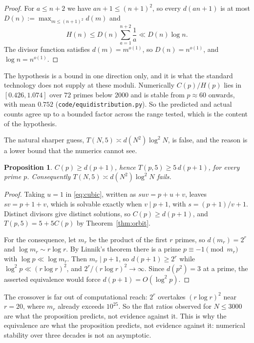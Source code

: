 \documentclass[11pt]{article}
\theoremstyle{plain}
\newtheorem{proposition}[theorem]{Proposition}
\theoremstyle{definition}
\begin{document}
\begin{proof}
For $a\le n+2$ we have $an+1\le(n+1)^2$, so every $d(an+1)$ is at most
$D(n):=\max_{m\le(n+1)^2}d(m)$ and
\[
  H(n)\le D(n)\sum_{a=1}^{n+2}\frac1a\ll D(n)\log n .
\]
The divisor function satisfies $d(m)=m^{o(1)}$, so $D(n)=n^{o(1)}$, and $\log n=n^{o(1)}$.
\end{proof}

The hypothesis is a bound in one direction only, and it is what the standard technology does
not supply at these moduli. Numerically $C(p)/H(p)$ lies in $[0.426,1.074]$ over $72$ primes
below $2000$ and is stable from $p\approx60$ onwards, with mean $0.752$
(\texttt{code/equidistribution.py}). So the predicted and actual counts agree up to a bounded
factor across the range tested, which is the content of the hypothesis.

The natural sharper guess, $T(N,5)\asymp d(N^2)\log^2 N$, is false, and the reason is a
lower bound that the numerics cannot see.

\begin{proposition}\label{prop:lower}
$C(p)\ge d(p+1)$, hence $T(p,5)\ge 5\,d(p+1)$, for every prime $p$. Consequently
$T(N,5)\asymp d(N^2)\log^2 N$ fails.
\end{proposition}

\begin{proof}
Taking $u=1$ in \eqref{eq:cubic}, written as $suv=p+u+v$, leaves $sv=p+1+v$, which is
solvable exactly when $v\mid p+1$, with $s=(p+1)/v+1$. Distinct divisors give distinct
solutions, so $C(p)\ge d(p+1)$, and $T(p,5)=5+5C(p)$ by Theorem~\ref{thm:orbit}.

For the consequence, let $m_r$ be the product of the first $r$ primes, so $d(m_r)=2^r$ and
$\log m_r\sim r\log r$. By Linnik's theorem there is a prime $p\equiv-1\pmod{m_r}$ with
$\log p\ll\log m_r$. Then $m_r\mid p+1$, so $d(p+1)\ge2^r$ while $\log^2p\ll(r\log r)^2$,
and $2^r/(r\log r)^2\to\infty$. Since $d(p^2)=3$ at a prime, the asserted equivalence would
force $d(p+1)=O(\log^2p)$.
\end{proof}

The crossover is far out of computational reach: $2^r$ overtakes $(r\log r)^2$ near
$r=20$, where $m_r$ already exceeds $10^{25}$. So the flat ratios observed for $N\le3000$
are what the proposition predicts, not evidence against it. This is why the equivalence
are what the proposition predicts, not evidence against it: numerical stability over
three decades is not an asymptotic.
\end{document}
